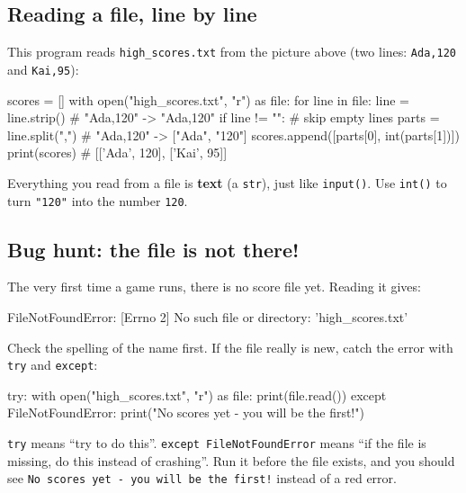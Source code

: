 \subsection{Reading a file, line by line}
This program reads \texttt{high\_scores.txt} from the picture above (two lines: \texttt{Ada,120} and \texttt{Kai,95}):
\begin{pycode}
scores = []
with open("high_scores.txt", "r") as file:
    for line in file:
        line = line.strip()            # "Ada,120\n" -> "Ada,120"
        if line != "":                 # skip empty lines
            parts = line.split(",")    # "Ada,120"   -> ["Ada", "120"]
            scores.append([parts[0], int(parts[1])])
print(scores)                          # [['Ada', 120], ['Kai', 95]]
\end{pycode}
Everything you read from a file is \textbf{text} (a \texttt{str}), just like \texttt{input()}. Use \texttt{int()} to turn \texttt{"120"} into the number \texttt{120}.

\subsection{Bug hunt: the file is not there!}
The very first time a game runs, there is no score file yet. Reading it gives:
\begin{outputcode}
FileNotFoundError: [Errno 2] No such file or directory: 'high_scores.txt'
\end{outputcode}
Check the spelling of the name first. If the file really is new, catch the error with \texttt{try} and \texttt{except}:
\begin{pycode}
try:
    with open("high_scores.txt", "r") as file:
        print(file.read())
except FileNotFoundError:
    print("No scores yet - you will be the first!")
\end{pycode}
\texttt{try} means \enquote{try to do this}. \texttt{except FileNotFoundError} means \enquote{if the file is missing, do this instead of crashing}.
Run it before the file exists, and you should see \texttt{No scores yet - you will be the first!} instead of a red error.

